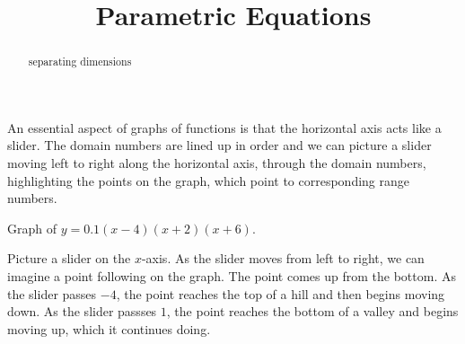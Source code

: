 \documentclass{ximera}
\title{Parametric Equations}
\begin{document}
\begin{abstract}
separating dimensions
\end{abstract}
\maketitle












An essential aspect of graphs of functions is that the horizontal axis acts like a slider.  The domain numbers are lined up in order and we can picture a slider moving left to right along the horizontal axis, through the domain numbers, highlighting the points on the graph, which point to corresponding range numbers.





Graph of $y = 0.1 (x-4) (x+2) (x+6)$.

\begin{image}
\end{image}


Picture a slider on the $x$-axis.  As the slider moves from left to right, we can imagine a point following on the graph.  The point comes up from the bottom. As the slider passes $-4$, the point reaches the top of a hill and then begins moving down. As the slider passses $1$, the point reaches the bottom of a valley and begins moving up, which it continues doing.
\end{document}
